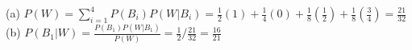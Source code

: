 \item (a) $P(W) = \sum_{i = 1}^{4} P(B_i) P(W | B_i) = \frac{1}{2} (1) + \frac{1}{4} (0) + \frac{1}{8} (\frac{1}{2}) + \frac{1}{8} (\frac{3}{4}) = \frac{21}{32}$ \\
	(b) $P(B_1 | W) = \frac{P(B_1) P(W | B_1)}{P(W)} = \frac{1}{2} / \frac{21}{32} = \frac{16}{21}$